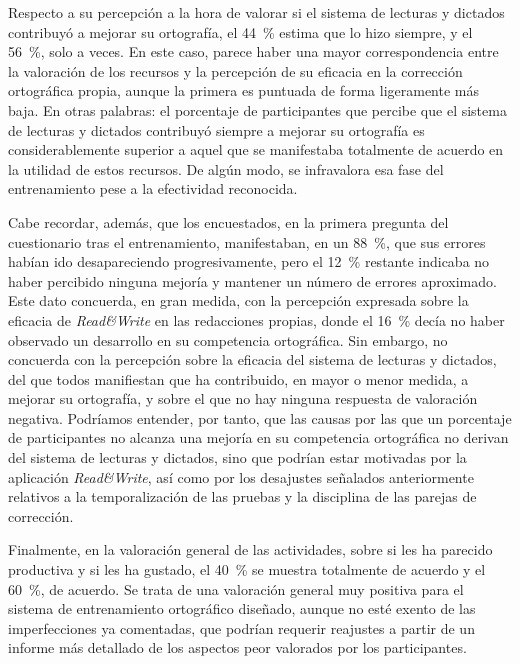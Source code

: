 \documentclass[spanish]{textolivre}
\begin{document}
Respecto a su percepción a la hora de valorar si el sistema de lecturas y dictados contribuyó a mejorar su ortografía, el 44~\% estima que lo hizo siempre, y el 56~\%, solo a veces. En este caso, parece haber una mayor correspondencia entre la valoración de los recursos y la percepción de su eficacia en la corrección ortográfica propia, aunque la primera es puntuada de forma ligeramente más baja. En otras palabras: el porcentaje de participantes que percibe que el sistema de lecturas y dictados contribuyó siempre a mejorar su ortografía es considerablemente superior a aquel que se manifestaba totalmente de acuerdo en la utilidad de estos recursos. De algún modo, se infravalora esa fase del entrenamiento pese a la efectividad reconocida.

Cabe recordar, además, que los encuestados, en la primera pregunta del cuestionario tras el entrenamiento, manifestaban, en un 88~\%, que sus errores habían ido desapareciendo progresivamente, pero el 12~\% restante indicaba no haber percibido ninguna mejoría y mantener un número de errores aproximado. Este dato concuerda, en gran medida, con la percepción expresada sobre la eficacia de \textit{Read\&Write} en las redacciones propias, donde el 16~\% decía no haber observado un desarrollo en su competencia ortográfica. Sin embargo, no concuerda con la percepción sobre la eficacia del sistema de lecturas y dictados, del que todos manifiestan que ha contribuido, en mayor o menor medida, a mejorar su ortografía, y sobre el que no hay ninguna respuesta de valoración negativa. Podríamos entender, por tanto, que las causas por las que un porcentaje de participantes no alcanza una mejoría en su competencia ortográfica no derivan del sistema de lecturas y dictados, sino que podrían estar motivadas por la aplicación \textit{Read\&Write}, así como por los desajustes señalados anteriormente relativos a la temporalización de las pruebas y la disciplina de las parejas de corrección.

Finalmente, en la valoración general de las actividades, sobre si les ha parecido productiva y si les ha gustado, el 40~\% se muestra totalmente de acuerdo y el 60~\%, de acuerdo. Se trata de una valoración general muy positiva para el sistema de entrenamiento ortográfico diseñado, aunque no esté exento de las imperfecciones ya comentadas, que podrían requerir reajustes a partir de un informe más detallado de los aspectos peor valorados por los participantes.
\end{document}
